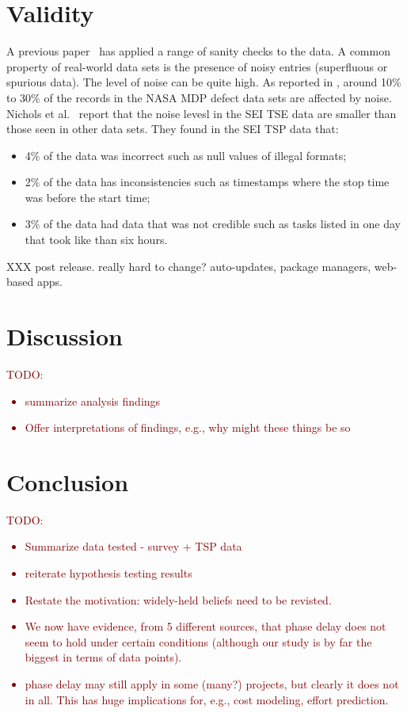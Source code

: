 \documentclass{sig-alternate}
\newcommand{\todo}[1]{\textcolor{Maroon}{TODO: #1}}
\newcommand{\bi}{\begin{itemize}[leftmargin=0.4cm]}
\newcommand{\ei}{\end{itemize}}
\begin{document}
 


 

\section{Validity} 
A previous paper~\cite{shirai14} has applied a range of sanity checks to the data.
A common property of real-world data sets is the presence
of noisy entries (superfluous  or spurious data). 
The level of noise can be quite high. As reported
in \cite{shepperd12}, around
10\% to 30\%
of the records in the NASA MDP defect data sets are
affected by noise. Nichols et al.~\cite{shirai14}  report that
the noise levesl in the SEI TSE data are smaller than those seen
in other data sets. They found in the SEI TSP data that:\bi 
\item
4\% of the data was incorrect such as  null values of illegal formats;
\item  2\% of the data has inconsistencies such as timestamps
where the stop time was before the start time;
\item 3\% of the data had data that was not credible
such as tasks listed in one day that took like than six hours.
\ei 


XXX post release. really hard to change? auto-updates, package managers, web-based apps. 
 
 \section{Discussion}
 \todo{
 \bi
    \item summarize analysis findings
    \item Offer interpretations of findings, e.g., why might these things be so
 \ei
 }
 
 
 \section{Conclusion}
 \todo{
 \bi
    \item Summarize data tested - survey + TSP data
    \item reiterate hypothesis testing results
    \item Restate the motivation: widely-held beliefs need to be revisted. 
    \item We now have evidence, from 5 different sources, that phase delay does not seem to hold under certain conditions (although our study is by far the biggest in terms of data points).
    \item phase delay may still apply in some (many?) projects, but clearly it does not in all. This has huge implications for, e.g., cost modeling, effort prediction.
 \ei
 }
 
\end{document}
